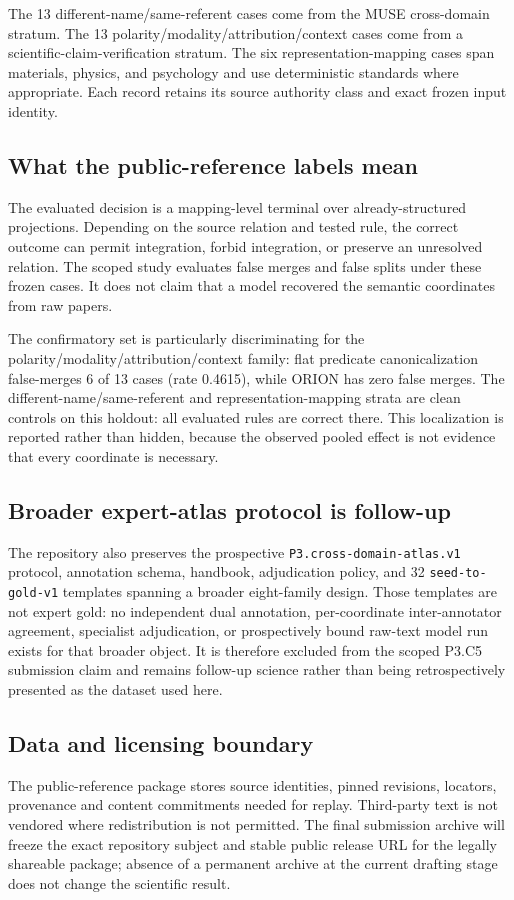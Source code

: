 The 13 different-name/same-referent cases come from the MUSE cross-domain
stratum. The 13 polarity/modality/attribution/context cases come from a
scientific-claim-verification stratum. The six representation-mapping cases
span materials, physics, and psychology and use deterministic standards where
appropriate. Each record retains its source authority class and exact frozen
input identity.

\subsection{What the public-reference labels mean}

The evaluated decision is a mapping-level terminal over already-structured
projections. Depending on the source relation and tested rule, the correct
outcome can permit integration, forbid integration, or preserve an unresolved
relation. The scoped study evaluates false merges and false splits under these
frozen cases. It does not claim that a model recovered the semantic coordinates
from raw papers.

The confirmatory set is particularly discriminating for the
polarity/modality/attribution/context family: flat predicate canonicalization
false-merges 6 of 13 cases (rate 0.4615), while ORION has zero false merges.
The different-name/same-referent and representation-mapping strata are clean
controls on this holdout: all evaluated rules are correct there. This
localization is reported rather than hidden, because the observed pooled effect
is not evidence that every coordinate is necessary.

\subsection{Broader expert-atlas protocol is follow-up}

The repository also preserves the prospective \texttt{P3.cross-domain-atlas.v1}
protocol, annotation schema, handbook, adjudication policy, and 32
\texttt{seed-to-gold-v1} templates spanning a broader eight-family design.
Those templates are not expert gold: no independent dual annotation,
per-coordinate inter-annotator agreement, specialist adjudication, or
prospectively bound raw-text model run exists for that broader object. It is
therefore excluded from the scoped P3.C5 submission claim and remains
\conststatus{} follow-up science rather than being retrospectively presented
as the dataset used here.

\subsection{Data and licensing boundary}

The public-reference package stores source identities, pinned revisions,
locators, provenance and content commitments needed for replay. Third-party
text is not vendored where redistribution is not permitted. The final
submission archive will freeze the exact repository subject and stable public
release URL for the legally shareable package; absence of a permanent archive
at the current drafting stage does not change the scientific result.

\endinput

